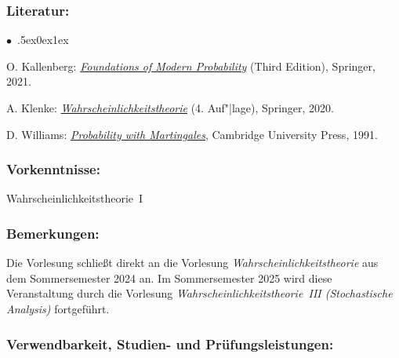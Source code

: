 \documentclass[a4paper,10pt]{article}
\renewenvironment{itemize}{\begin{list}{$\bullet$\ }{\itemsep.5ex\setlength{\topsep}{0.5\itemsep}\parsep0ex\labelsep1ex\settowidth{\labelwidth}{$\bullet$\ }\setlength{\leftmargin}{\labelwidth}\addtolength{\leftmargin}{3ex}\addtolength{\leftmargin}{\labelsep}}}{\end{list}}
\begin{document}
\subsubsection*{\large
    Literatur:
}
\begin{itemize}
\item
 O. Kallenberg: \href{https://link.springer.com/book/10.1007/978-3-030-61871-1}{\emph{Foundations of Modern Probability}} (Third Edition), Springer, 2021.
\item
 A. Klenke: \href{https://link.springer.com/book/10.1007/978-3-662-62089-2}{\emph{Wahrscheinlichkeitstheorie}} (4. Auf"|lage), Springer, 2020. 
\item 
D. Williams: \href{https://edisciplinas.usp.br/pluginfile.php/343758/mod_folder/content/0/Probability With Martingales(Williams).pdf}{\emph{Probability with Martingales}}, Cambridge University Press, 1991. 
\end{itemize}
\subsubsection*{\large
    Vorkenntnisse:
}
Wahrscheinlichkeitstheorie~I
\subsubsection*{\large
    Bemerkungen:
}
Die Vorlesung schließt direkt an die Vorlesung {\em Wahrscheinlichkeitstheorie} aus dem Sommersemester 2024 an. Im Sommersemester 2025 wird diese Veranstaltung durch die Vorlesung {\em Wahrscheinlichkeitstheorie~III (Stochastische Analysis)} fortgeführt.
\cleardoublepage
\subsubsection*{\large
    Verwendbarkeit, Studien- und Prüfungsleistungen:
}
\end{document}
